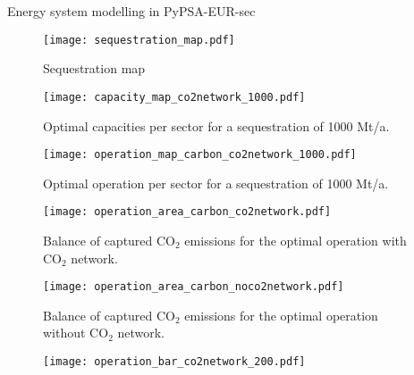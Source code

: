 Energy system modelling in PyPSA-EUR-sec~\cite{brownSynergiesSectorCoupling2018}


\begin{figure}
    \centering
    \texttt{[image: sequestration\_map.pdf]}
    \caption{Sequestration map}
    \label{fig:sequestration_map}
\end{figure}


\begin{figure*}[h]
    \centering
    \texttt{[image: capacity\_map\_co2network\_1000.pdf]}
    \caption{Optimal capacities per sector for a sequestration of 1000 Mt/a.}
    \label{fig:capacity_map_noco2network_1000}
\end{figure*}

\begin{figure*}
    \centering
    \texttt{[image: operation\_map\_carbon\_co2network\_1000.pdf]}
    \caption{Optimal operation per sector for a sequestration of 1000 Mt/a.}
    \label{fig:operation_map_noco2network_1000}
\end{figure*}


\begin{figure}
    \centering
    \texttt{[image: operation\_area\_carbon\_co2network.pdf]}
    \caption{Balance of captured CO$_2$ emissions for the optimal operation with CO$_2$ network.}
    \label{fig:operation_area_carbon_co2network}
\end{figure}

\begin{figure}
    \centering
    \texttt{[image: operation\_area\_carbon\_noco2network.pdf]}
    \caption{Balance of captured CO$_2$ emissions for the optimal operation without CO$_2$ network.}
    \label{fig:operation_area_carbon_noco2network}
\end{figure}


\begin{figure}
    \centering
    \texttt{[image: operation\_bar\_co2network\_200.pdf]}
\end{figure}
